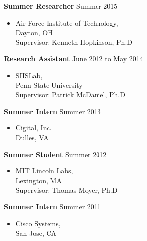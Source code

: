 \documentclass[10pt]{article}
\newenvironment{innerlist}[1][\enskip\textbullet]%
        {\begin{itemize}[#1,leftmargin=*,parsep=0pt,itemsep=0pt,topsep=0pt,partopsep=0pt]}
        {\end{itemize}}
\begin{document}
\textbf{Summer Researcher} \hfill {Summer 2015}
\begin{innerlist}

\item[] Air Force Institute of Technology,\\
        Dayton, OH\\
        Supervisor: Kenneth Hopkinson, Ph.D
\end{innerlist}
\textbf{Research Assistant} \hfill {June 2012 to May 2014}
\begin{innerlist}

\item[] SIISLab,\\
        Penn State University\\
        Supervisor: Patrick McDaniel, Ph.D
\end{innerlist}
\textbf{Summer Intern} \hfill {Summer 2013}
\begin{innerlist}

\item[] Cigital, Inc.\\
        Dulles, VA
\end{innerlist}
\textbf{Summer Student} \hfill {Summer 2012}
\begin{innerlist}

\item[] MIT Lincoln Labs,\\
        Lexington, MA\\
        Supervisor: Thomas Moyer, Ph.D
\end{innerlist}
\textbf{Summer Intern} \hfill {Summer 2011}
\begin{innerlist}
\item[] Cisco Systems,\\
        San Jose, CA
\end{innerlist}
\end{document}
